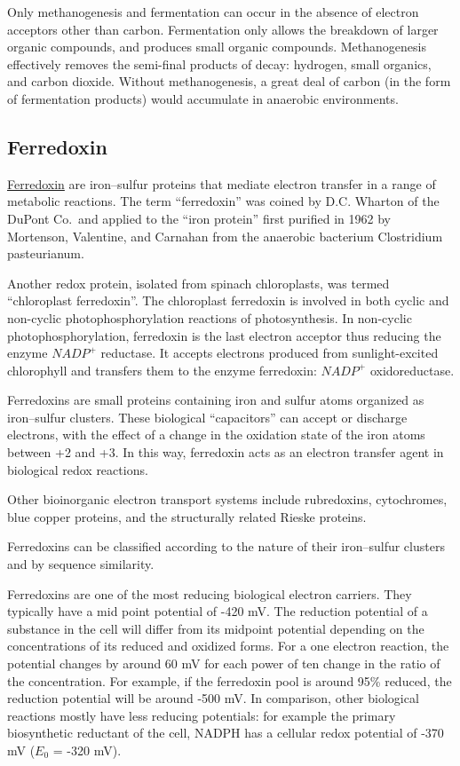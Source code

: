 \documentclass{article}
\begin{document}
Only methanogenesis and fermentation can occur in the absence of electron acceptors other
than carbon. Fermentation only allows the breakdown of larger organic compounds, and
produces small organic compounds. Methanogenesis effectively removes the semi-final
products of decay: hydrogen, small organics, and carbon dioxide. Without methanogenesis, a
great deal of carbon (in the form of fermentation products) would accumulate in anaerobic
environments.

\subsection{Ferredoxin}
\href{https://en.wikipedia.org/wiki/Ferredoxin}{Ferredoxin}
are iron–sulfur proteins that mediate electron transfer in a range of metabolic reactions.
The term ``ferredoxin'' was coined by D.C. Wharton of the DuPont Co.\ and applied to the
``iron protein'' first purified in 1962 by Mortenson, Valentine, and Carnahan from the
anaerobic bacterium Clostridium pasteurianum.

Another redox protein, isolated from spinach chloroplasts, was termed ``chloroplast
ferredoxin''. The chloroplast ferredoxin is involved in both cyclic and non-cyclic
photophosphorylation reactions of photosynthesis. In non-cyclic photophosphorylation,
ferredoxin is the last electron acceptor thus reducing the enzyme $NADP^+$ reductase. It
accepts electrons produced from sunlight-excited chlorophyll and transfers them to the
enzyme ferredoxin: $NADP^+$ oxidoreductase.

Ferredoxins are small proteins containing iron and sulfur atoms organized as iron–sulfur
clusters. These biological ``capacitors'' can accept or discharge electrons, with the
effect of a change in the oxidation state of the iron atoms between +2 and +3. In this
way, ferredoxin acts as an electron transfer agent in biological redox reactions.

Other bioinorganic electron transport systems include rubredoxins, cytochromes, blue
copper proteins, and the structurally related Rieske proteins.

Ferredoxins can be classified according to the nature of their iron–sulfur clusters and by
sequence similarity.

Ferredoxins are one of the most reducing biological electron carriers. They typically have
a mid point potential of -420 mV. The reduction potential of a substance in the cell
will differ from its midpoint potential depending on the concentrations of its reduced and
oxidized forms. For a one electron reaction, the potential changes by around 60 mV for
each power of ten change in the ratio of the concentration. For example, if the ferredoxin
pool is around 95\% reduced, the reduction potential will be around -500 mV. In
comparison, other biological reactions mostly have less reducing potentials: for example
the primary biosynthetic reductant of the cell, NADPH has a cellular redox potential of
-370 mV ($E_0$ = -320 mV).
\end{document}

